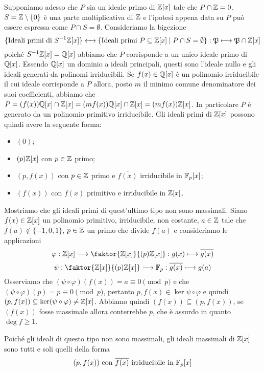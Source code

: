 \documentclass[11pt]{scrartcl}
\begin{document}
Supponiamo adesso che $P$ sia un ideale primo di $\mathbb Z[x]$ tale che 
$P \cap \mathbb Z = 0$. $S = \mathbb Z\setminus \{0\}$ è una parte moltiplicativa di 
$\mathbb Z$ e l'ipotesi appena data su $P$ può essere espressa come $P \cap S = \emptyset$.
Consideriamo la bigezione 
\[
    \{\text{Ideali primi di }S^{-1}\mathbb Z[x]\}\leftarrow\mathrel{\mkern-7mu}\rightarrow 
    \{\text{Ideali primi } P\subseteq \mathbb Z[x] \mid P\cap S = \emptyset\}: 
    \mathfrak{P}\longmapsto \mathfrak{P}\cap\mathbb Z[x]
\]
poiché $S^{-1}\mathbb Z[x] = \mathbb Q[x]$ abbiamo che $P$ corrisponde a un unico ideale
primo di $\mathbb Q[x]$. Essendo $\mathbb Q[x]$ un dominio a ideali principali, questi sono
l'ideale nullo e gli ideali generati da polinomi irriducibili. Se $f(x)\in \mathbb Q[x]$
è un polinomio irriducibile il cui ideale corrisponde a $P$ allora, posto 
$m$ il minimo comune denominatore dei suoi coefficienti, abbiamo che 
$P = (f(x))\mathbb Q[x] \cap \mathbb Z[x] = (mf(x))\mathbb Q[x]\cap\mathbb Z[x] = (mf(x))\mathbb Z[x]$. 
In particolare $P$ è generato da un polinomio primitivo irriducibile.
Gli ideali primi di $\mathbb Z[x]$ possono quindi avere la seguente forma:
\begin{itemize}
    \item $(0)$;
    \item $(p)\mathbb Z[x]$ con $p \in \mathbb Z$ primo;
    \item $(p, f(x))$ con $p \in \mathbb Z$ primo e $\overline{f(x)}$ irriducibile
    in $\mathbb F_p[x]$;
    \item $(f(x))$ con $f(x)$ primitivo e irriducibile in $\mathbb Z[x]$.
\end{itemize}

Mostriamo che gli ideali primi di quest'ultimo tipo non sono massimali.\newline
Siano $f(x) \in \mathbb Z[x]$ un polinomio primitivo, irriducibile, non costante,
$a \in \mathbb Z$ tale che $f(a) \notin\{-1, 0, 1\}$, $p \in \mathbb Z$ un primo che 
divide $f(a)$ e consideriamo le applicazioni
\[
    \varphi: \ZZ[x]\longrightarrow \faktor{\ZZ[x]}{(p)\ZZ[x]}: 
    g(x)\longmapsto \overline{g(x)}
\] 
\[
    \psi: \faktor{\ZZ[x]}{(p)\ZZ[x]}\longrightarrow \FF_p: 
    \overline{g(x)}\longmapsto g(a)
\]
Osserviamo che $(\psi\circ\varphi)(f(x)) = a \equiv 0 \pmod{p}$ e che 
$(\psi\circ\varphi)(p) = p \equiv 0 \pmod{p}$, pertanto $p, f(x) \in 
\ker{\psi\circ\varphi}$ e quindi $(p, f(x)) \subseteq \ker(\psi\circ \varphi) \neq \mathbb Z[x]$.
Abbiamo quindi $(f(x)) \subseteq (p, f(x))$, se $(f(x))$ fosse massimale allora
conterrebbe $p$, che è assurdo in quanto $\deg f \geq 1$.

Poiché gli ideali di questo tipo non sono massimali, gli ideali massimali di
$\mathbb Z[x]$ sono tutti e soli quelli della forma
\[
    (p, f(x)) \text{ con }\overline{f(x)} \text{ irriducibile in }\mathbb F_p[x]
\]
\end{document}
